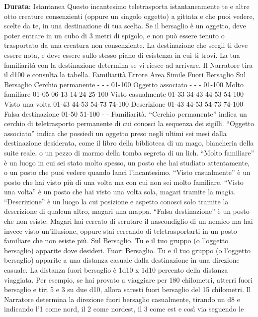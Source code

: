 \begin{multicols}{2}
\textbf{Durata}: Istantanea
Questo incantesimo teletrasporta istantaneamente te e
altre otto creature consenzienti (oppure un singolo
oggetto) a gittata e che puoi vedere, scelte da te, in una
destinazione di tua scelta. Se il bersaglio è un oggetto,
deve poter entrare in un cubo di 3 metri di spigolo, e
non può essere tenuto o trasportato da una creatura
non consenziente.
La destinazione che scegli ti deve essere nota, e deve
essere sullo stesso piano di esistenza in cui ti trovi. La
tua familiarità con la destinazione determina se vi riesce
ad arrivare. Il Narratore tira il d100 e consulta la tabella.
Familiarità Errore Area
Simile
Fuori
Bersaglio
Sul
Bersaglio
Cerchio
permanente
- - - 01-100
Oggetto
associato
- - - 01-100
Molto
familiare
01-05 06-13 14-24 25-100
Visto
casualmente
01-33 34-43 44-53 54-100
Visto una
volta
01-43 44-53 54-73 74-100
Descrizione 01-43 44-53 54-73 74-100
Falsa
destinazione
01-50 51-100 - -
Familiarità. “Cerchio permanente” indica un cerchio di
teletrasporto permanente di cui conosci la sequenza dei
sigilli. “Oggetto associato” indica che possiedi un
oggetto preso negli ultimi sei mesi dalla destinazione
desiderata, come il libro della biblioteca di un mago,
biancheria della suite reale, o un pezzo di marmo della
tomba segreta di un lich.
“Molto familiare” è un luogo in cui sei stato molto
spesso, un posto che hai studiato attentamente, o un
posto che puoi vedere quando lanci l’incantesimo.
“Visto casualmente” è un posto che hai visto più di una
volta ma con cui non sei molto familiare. “Visto una
volta” è un posto che hai visto una volta sola, magari
tramite la magia. “Descrizione” è un luogo la cui
posizione e aspetto conosci solo tramite la descrizione
di qualcun altro, magari una mappa.
“Falsa destinazione” è un posto che non esiste. Magari
hai cercato di scrutare il nascondiglio di un nemico ma
hai invece visto un’illusione, oppure stai cercando di
teletrasportarti in un posto familiare che non esiste più.
Sul Bersaglio. Tu e il tuo gruppo (o l’oggetto bersaglio)
apparite dove desideri.
Fuori Bersaglio. Tu e il tuo gruppo (o l’oggetto
bersaglio) apparite a una distanza casuale dalla
destinazione in una direzione casuale. La distanza fuori
bersaglio è 1d10 x 1d10 percento della distanza
viaggiata. Per esempio, se hai provato a viaggiare per
180 chilometri, atterri fuori bersaglio e tiri 5 e 3 su due
d10, allora saresti fuori bersaglio del 15%
chilometri. Il Narratore determina la direzione fuori bersaglio
casualmente, tirando un d8 e indicando l’1 come nord, il
2 come nordest, il 3 come est e così via seguendo le

\end{multicols}
